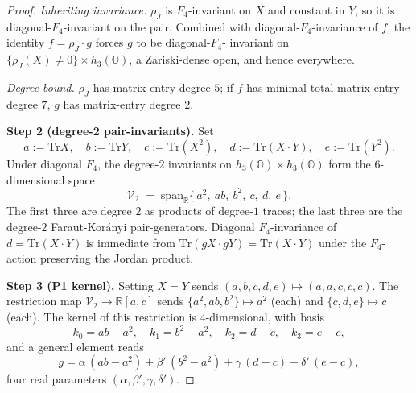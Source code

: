 \documentclass[12pt]{article}
\theoremstyle{remark}
\newcommand{\hthree}{h_3(\mathbb{O})}
\newcommand{\Ffour}{F_4}
\newcommand{\rhoJ}{\rho_J}
\newcommand{\Tr}{\mathrm{Tr}}
\begin{document}
\begin{proof}
\emph{Inheriting invariance.} $\rhoJ$ is $\Ffour$-invariant on $X$
and constant in $Y$, so it is diagonal-$\Ffour$-invariant on the
pair. Combined with diagonal-$\Ffour$-invariance of $f$, the
identity $f = \rhoJ \cdot g$ forces $g$ to be diagonal-$\Ffour$-
invariant on $\{\rhoJ(X) \neq 0\} \times \hthree$, a Zariski-dense
open, and hence everywhere.

\emph{Degree bound.} $\rhoJ$ has matrix-entry degree $5$; if $f$
has minimal total matrix-entry degree $7$, $g$ has matrix-entry
degree $2$.

\textbf{Step 2 (degree-2 pair-invariants).} Set
\[
  a := \Tr X, \quad b := \Tr Y, \quad c := \Tr(X^2), \quad
  d := \Tr(X \cdot Y), \quad e := \Tr(Y^2).
\]
Under diagonal $\Ffour$, the degree-$2$ invariants on
$\hthree \times \hthree$ form the $6$-dimensional space
\[
  \mathcal{V}_2 \;=\; \mathrm{span}_{\mathbb{R}}\{\,a^2,\ ab,\ b^2,\ c,\ d,\ e\,\}.
\]
The first three are degree $2$ as products of degree-$1$ traces;
the last three are the degree-$2$ Faraut-Kor\'anyi pair-generators.
Diagonal $\Ffour$-invariance of $d = \Tr(X \cdot Y)$ is immediate
from $\Tr(gX \cdot gY) = \Tr(X \cdot Y)$ under the $\Ffour$-action
preserving the Jordan product.

\textbf{Step 3 (P1 kernel).} Setting $X = Y$ sends $(a, b, c, d, e)
\mapsto (a, a, c, c, c)$. The restriction map
$\mathcal{V}_2 \to \mathbb{R}[a, c]$ sends
$\{a^2, ab, b^2\} \mapsto a^2$ (each) and $\{c, d, e\} \mapsto c$
(each). The kernel of this restriction is $4$-dimensional, with
basis
\[
  k_0 = ab - a^2,\quad k_1 = b^2 - a^2,\quad k_2 = d - c,\quad k_3 = e - c,
\]
and a general element reads
\begin{equation}\label{eq:p1-kernel}
  g = \alpha\,(ab - a^2) + \beta'\,(b^2 - a^2) + \gamma\,(d - c) + \delta'\,(e - c),
\end{equation}
four real parameters $(\alpha, \beta', \gamma, \delta')$.


\end{proof}
\end{document}
